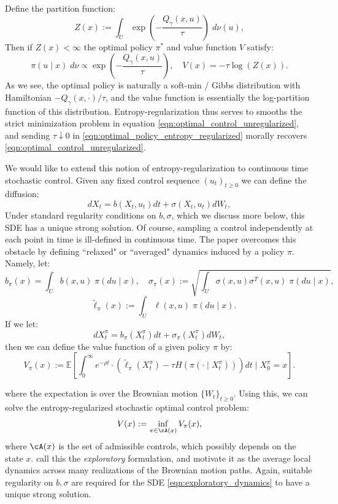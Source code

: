 \documentclass[11pt,oneside,reqno]{article}
\theoremstyle{plain}
\theoremstyle{definition}
\numberwithin{equation}{section}
\renewcommand{\cite}{\citet}
\renewcommand{\geq}{\geqslant}
\newcommand{\E}{\mathbb{E}}
\begin{document}
%
\noindent Define the partition function:
%
\[Z(x) := \int_U \exp\left(-\frac{Q_\gamma(x,u)}{\tau}\right) \; d\nu(u),\]
%
\noindent Then if $Z(x) < \infty$  the optimal policy $\pi^*$ and value function $V$ satisfy:
%
\begin{equation}
	\pi(u \mid x) \; d\nu \propto \exp\left(-\frac{Q_\gamma(x,u)}{\tau} \right), \quad V(x) = -\tau \log(Z(x)).
	\label{eqn:optimal_policy_entropy_regularized}
\end{equation}
%
\noindent As we see, the optimal policy is naturally a soft-min / Gibbs distribution with Hamiltonian $-Q_\gamma(x, \cdot ) / \tau$, and the value function
is essentially the log-partition function of this distribution. Entropy-regularization thus serves to smooths
the strict minimization problem in equation \eqref{eqn:optimal_control_unregularized}, and sending $\tau \downarrow 0$ in \eqref{eqn:optimal_policy_entropy_regularized} 
morally recovers \eqref{eqn:optimal_control_unregularized}.

 We would like to extend this notion of entropy-regularization to continuous time stochastic control. Given any fixed control sequence $(u_t)_{t \geq 0}$ we can define the diffusion:
%
\[dX_t = b(X_t, u_t) dt + \sigma(X_t, u_t) dW_t,\]
%
Under standard regularity conditions on $b, \sigma$, which we discuss more below, this SDE has a unique strong solution. Of course, sampling a control independently at each point in time is ill-defined in continuous time.
The paper \cite{WangZariphopoulouZhou2020} overcomes this obstacle by defining ``relaxed" or ``averaged" dynamics induced by a policy $\pi$. Namely, let:
%
	\[b_\pi(x) = \int_U b(x, u) \;\pi(du \mid x), \quad \sigma_\pi(x) := \sqrt{\int_U \sigma(x, u) \sigma^T(x,u) \;\pi(du \mid x)}, \]
	\[\quad \tilde{\ell}_\pi(x) := \int_U \ell(x, u) \; \pi(du \mid x).\]
%
If we let:
%
\begin{equation}
	dX^\pi_t = b_\pi(X^\pi_t) dt + \sigma_\pi(X^\pi_t) dW_t,
	\label{eqn:exploratory_dynamics}
\end{equation}
%
\noindent then we can define the value function of a given policy $\pi$ by:
%
\begin{equation}
	V_\pi(x) := \E\left[ \int_0^\infty e^{-\rho t} \cdot (\tilde{\ell}_\pi(X^\pi_t) - \tau H(\pi(\cdot \mid X^\pi_t))) dt\;\bigg\vert\; X^\pi_0 = x\right].
	\label{eqn:exploratory_value_function}
\end{equation}

\noindent where the expectation is over the Brownian motion $\{W_t\}_{t \geq 0}$. Using this, we can solve the entropy-regularized stochastic optimal control problem:
%
\begin{equation}
	V(x) := \inf_{\pi \in \cA(x)} V_\pi(x),
	\label{eqn:exploratory_optimal_value_function}
\end{equation}
%
\noindent  where $\cA(x)$ is the set of admissible controls, which possibly depends on the state $x$. \cite{WangZariphopoulouZhou2020} call this the \textit{exploratory} formulation, and motivate it as the average local dynamics 
across many realizations of the Brownian motion paths. Again, suitable regularity on $b, \sigma$ are required for the SDE \ref{eqn:exploratory_dynamics} to have a unique strong solution.
\end{document}
